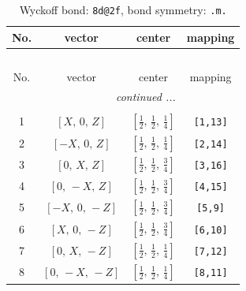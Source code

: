 \documentclass[fleqn,8pt]{jsarticle}
\begin{document}
\begin{longtable}{cccc}
\caption{Wyckoff bond: {\tt 8d@2f}, bond symmetry: {\tt .m.}}
 \\
 \hline \hline
No. & vector & center & mapping \\ \hline \endfirsthead

\multicolumn{3}{l}{\tablename\ \thetable{}} \\
 \hline \hline
No. & vector & center & mapping \\ \hline \endhead

 \hline \hline
\multicolumn{3}{r}{\footnotesize\it continued ...} \\ \endfoot

 \hline \hline
\multicolumn{3}{r}{} \\ \endlastfoot

1 & $\left[ X,\, 0,\, Z \right]$ & $\left[ \frac{1}{2},\, \frac{1}{2},\, \frac{1}{4} \right]$ & {\tt [1,13]} \\ \hline
2 & $\left[ - X,\, 0,\, Z \right]$ & $\left[ \frac{1}{2},\, \frac{1}{2},\, \frac{1}{4} \right]$ & {\tt [2,14]} \\ \hline
3 & $\left[ 0,\, X,\, Z \right]$ & $\left[ \frac{1}{2},\, \frac{1}{2},\, \frac{3}{4} \right]$ & {\tt [3,16]} \\ \hline
4 & $\left[ 0,\, - X,\, Z \right]$ & $\left[ \frac{1}{2},\, \frac{1}{2},\, \frac{3}{4} \right]$ & {\tt [4,15]} \\ \hline
5 & $\left[ - X,\, 0,\, - Z \right]$ & $\left[ \frac{1}{2},\, \frac{1}{2},\, \frac{3}{4} \right]$ & {\tt [5,9]} \\ \hline
6 & $\left[ X,\, 0,\, - Z \right]$ & $\left[ \frac{1}{2},\, \frac{1}{2},\, \frac{3}{4} \right]$ & {\tt [6,10]} \\ \hline
7 & $\left[ 0,\, X,\, - Z \right]$ & $\left[ \frac{1}{2},\, \frac{1}{2},\, \frac{1}{4} \right]$ & {\tt [7,12]} \\ \hline
8 & $\left[ 0,\, - X,\, - Z \right]$ & $\left[ \frac{1}{2},\, \frac{1}{2},\, \frac{1}{4} \right]$ & {\tt [8,11]} \\
\end{longtable}
\renewcommand{\arraystretch}{1.2}
\end{document}
